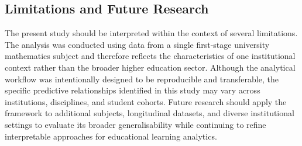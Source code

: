 \subsection*{Limitations and Future Research}

The present study should be interpreted within the context of several limitations. The analysis was conducted using data from a single first-stage university mathematics 
subject and therefore reflects the characteristics of one institutional context rather than the broader higher education sector. Although the analytical workflow was 
intentionally designed to be reproducible and transferable, the specific predictive relationships identified in this study may vary across institutions, disciplines, and 
student cohorts. Future research should apply the framework to additional subjects, longitudinal datasets, and diverse institutional settings to evaluate its broader 
generalisability while continuing to refine interpretable approaches for educational learning analytics.

